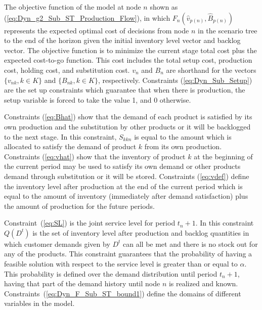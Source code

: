 \documentclass[10pt]{article}
\newcommand{\ti}{t} %
\newcommand{\ka}{k} %
\newcommand{\Bi}{B} %
\newcommand{\Vi}{v} %
\newcommand{\Es}{S} %
\newcommand{\InvPos}{inventory level after production }
\begin{document}
The objective function of the model at node $n$ shown as (\ref{eq:Dyn_g2_Sub_ST_Production_Flow}), in which $F_{n}(\hat{\Vi}_{p(n)},\hat{\Bi}_{p(n)}) $ represents the expected optimal cost of decisions from node $n$ in the scenario tree to the end of the horizon given the initial inventory level vector and backlog vector. The objective function is to minimize the current stage total cost plus the expected cost-to-go function. This cost includes the total setup cost, production cost, holding cost, and substitution cost.  $\Vi_n$ and $\Bi_n$ are shorthand for the vectors $\{ v_{nk}, k \in K\}$ and $\{ B_{nk}, k \in K\}$, respectively.
Constraints (\ref{eq:Dyn_Sub_Setup}) are the set up constraints which guarantee that when there is production, the setup variable is forced to take the value 1, and 0 otherwise. 

Constraints (\ref{eq:Bhat}) show that the demand of each product is satisfied by its own production and the substitution by other products or it will be backlogged to the next stage. In this constraint, $\Es_{\ka \ka n}$ is equal to the amount which is allocated to satisfy the demand of product $k$ from its own production. Constraints (\ref{eq:vhat}) show that the inventory of product $\ka$ at the beginning of the current period may be used to satisfy its own demand or other products demand through substitution or it will be stored. Constraints (\ref{eq:vdef}) define the \InvPos at the end of the current period which is equal to the amount of inventory (immediately after demand satisfaction) plus the amount of production for the future periods. 

Constraint~(\ref{eq:SL}) is the joint service level for period $\ti_n+1$. In this constraint $Q(D^\ti)$ is the set of \InvPos and backlog quantities in which customer demands given by $D^\ti$ can all be met and there is no stock out for any of the products. This constraint guarantees that the probability of having a feasible solution with respect to the service level is greater than or equal to $\alpha$. This probability is defined over the demand distribution until period $\ti_n+1$, having that part of the demand history until node $n$ is realized and known. Constraints~(\ref{eq:Dyn_F_Sub_ST_bound1}) define the domains of different variables in the model. 

\end{document}
